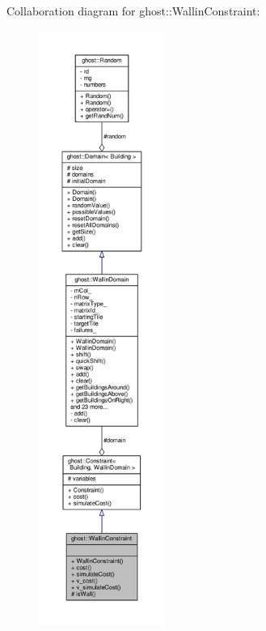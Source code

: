 Collaboration diagram for ghost\-:\-:Wallin\-Constraint\-:\nopagebreak
\begin{figure}[H]
\begin{center}
\leavevmode
\includegraphics[height=550pt]{classghost_1_1WallinConstraint__coll__graph}
\end{center}
\end{figure}
